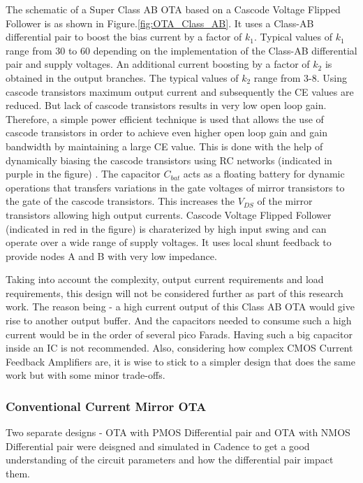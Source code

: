 The schematic of a Super Class AB OTA based on a Cascode Voltage Flipped Follower is as shown in Figure.\ref{fig:OTA_Class_AB}. It uses a Class-AB differential pair to boost the bias current by a factor of $k_1$. Typical values of $k_1$ range from 30 to 60 depending on the implementation of the Class-AB differential pair and supply voltages. An additional current boosting by a factor of $k_2$ is obtained in the output branches. The typical values of $k_2$ range from 3-8. Using cascode transistors maximum output current and subsequently the CE values are reduced. But lack of cascode transistors results in very low open loop gain. Therefore, a simple power efficient technique is used that allows the use of cascode transistors in order to achieve even higher open loop gain and gain bandwidth by maintaining a large CE value. This is done with the help of dynamically biasing the cascode transistors using RC networks (indicated in purple in the figure) \cite{super_class_ab}. The capacitor $C_{bat}$ acts as a floating battery for dynamic operations that transfers variations in the gate voltages of mirror transistors to the gate of the cascode transistors. This increases the $V_{DS}$ of the mirror transistors allowing high output currents. Cascode Voltage Flipped Follower (indicated in red in the figure) is charaterized by high input swing and can operate over a wide range of supply voltages. It uses local shunt feedback to provide nodes A and B with very low impedance.

Taking into account the complexity, output current requirements and load requirements, this design will not be considered further as part of this research work. The reason being - a high current output of this Class AB OTA would give rise to another output buffer. And the capacitors needed to consume such a high current would be in the order of several pico Farads. Having such a big capacitor inside an IC is not recommended. Also, considering how complex CMOS Current Feedback Amplifiers are, it is wise to stick to a simpler design that does the same work but with some minor trade-offs.

\subsubsection{Conventional Current Mirror OTA}
Two separate designs - OTA with PMOS Differential pair and OTA with NMOS Differential pair were deisgned and simulated in Cadence to get a good understanding of the circuit parameters and how the differential pair impact them. 

